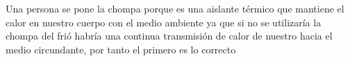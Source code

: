 \begin{enumerate}[itemsep=2pt]
	      Una persona se pone la chompa porque es una aislante térmico que 	mantiene el calor en nuestro cuerpo con el medio ambiente ya que si no se 	utilizaría 	la chompa del frió habría una continua 	transmisión 	de calor de nuestro  hacia el medio circundante, por tanto el primero es 	lo correcto
\end{enumerate}
%
%
%
